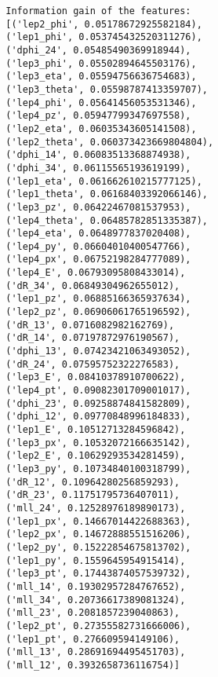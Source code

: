 \documentclass[a4paper, american, 12pt]{report}
\begin{document}
	\begin{lstlisting}
		Information gain of the features:
		[('lep2_phi', 0.05178672925582184), 
		('lep1_phi', 0.053745432520311276), 
		('dphi_24', 0.05485490369918944), 
		('lep3_phi', 0.05502894645503176), 
		('lep3_eta', 0.05594756636754683), 
		('lep3_theta', 0.05598787413359707), 
		('lep4_phi', 0.05641456053531346), 
		('lep4_pz', 0.05947799347697558), 
		('lep2_eta', 0.06035343605141508), 
		('lep2_theta', 0.060373423669804804), 
		('dphi_14', 0.06083513368874938), 
		('dphi_34', 0.06115565193619199), 
		('lep1_eta', 0.061662610215777125), 
		('lep1_theta', 0.06168403392066146), 
		('lep3_pz', 0.06422467081537953), 
		('lep4_theta', 0.06485782851335387), 
		('lep4_eta', 0.0648977837020408), 
		('lep4_py', 0.06604010400547766), 
		('lep4_px', 0.06752198284777089), 
		('lep4_E', 0.06793095808433014), 
		('dR_34', 0.06849304962655012), 
		('lep1_pz', 0.06885166365937634), 
		('lep2_pz', 0.06906061765196592), 
		('dR_13', 0.0716082982162769), 
		('dR_14', 0.07197872976190567), 
		('dphi_13', 0.07423421063493052), 
		('dR_24', 0.07595752322276583), 
		('lep3_E', 0.08410378910700622), 
		('lep4_pt', 0.09082301709001017), 
		('dphi_23', 0.09258874841582809), 
		('dphi_12', 0.09770848996184833), 
		('lep1_E', 0.10512713284596842), 
		('lep3_px', 0.10532072166635142), 
		('lep2_E', 0.10629293534281459), 
		('lep3_py', 0.10734840100318799), 
		('dR_12', 0.10964280256859293), 
		('dR_23', 0.11751795736407011), 
		('mll_24', 0.12528976189890173), 
		('lep1_px', 0.14667014422688363), 
		('lep2_px', 0.14672888551516206), 
		('lep2_py', 0.15222854675813702), 
		('lep1_py', 0.1559645954915414), 
		('lep3_pt', 0.17443874057539732), 
		('mll_14', 0.19302957284767652), 
		('mll_34', 0.20736617389081324), 
		('mll_23', 0.2081857239040863), 
		('lep2_pt', 0.27355582731666006), 
		('lep1_pt', 0.276609594149106), 
		('mll_13', 0.28691694495451703), 
		('mll_12', 0.3932658736116754)]
	\end{lstlisting}
	
\end{document}
